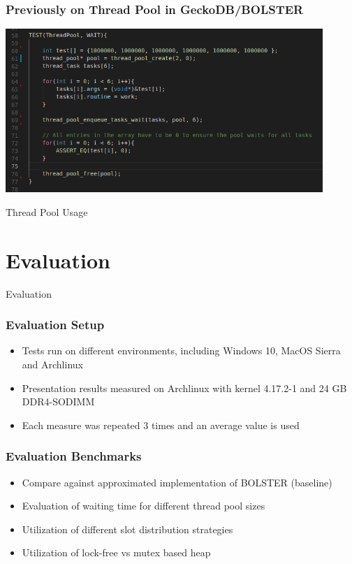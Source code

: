 \documentclass{beamer}
\begin{document}
\begin{frame}
	\frametitle{Previously on Thread Pool in GeckoDB/BOLSTER}
	\begin{center}
		\includegraphics[width=0.9\textwidth]{img/thread_pool_use.png}
		
	\end{center}
	\begin{center}
		Thread Pool Usage
	\end{center}
\end{frame}

\section{Evaluation}
\begin{frame}
	\begin{center}
		\huge Evaluation
	\end{center}
\end{frame}

\begin{frame}
	\frametitle{Evaluation Setup}
	\begin{itemize}
		\item Tests run on different environments, including Windows 10, MacOS Sierra and Archlinux
		\item Presentation results measured on Archlinux with kernel 4.17.2-1 and 24 GB DDR4-SODIMM
		\item Each measure was repeated 3 times and an average value is used
	\end{itemize}
\end{frame}

\begin{frame}
	\frametitle{Evaluation Benchmarks}
	\begin{itemize}
		\item Compare against approximated implementation of BOLSTER (baseline)
		\item Evaluation of waiting time for different thread pool sizes
		\item Utilization of different slot distribution strategies
		\item Utilization of lock-free vs mutex based heap
	\end{itemize}
\end{frame}
\end{document}
